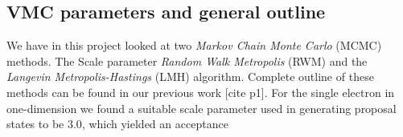 \subsection{VMC parameters and general outline}
We have in this project looked at two \textit{Markov Chain Monte Carlo} (MCMC) methods. The Scale parameter \textit{Random Walk Metropolis} (RWM) and the \textit{Langevin Metropolis-Hastings} (LMH) algorithm. Complete outline of these methods can be found in our previous work [cite p1]. For the single electron in one-dimension we found a suitable scale parameter used in generating proposal states to be $3.0$, which yielded an acceptance 
